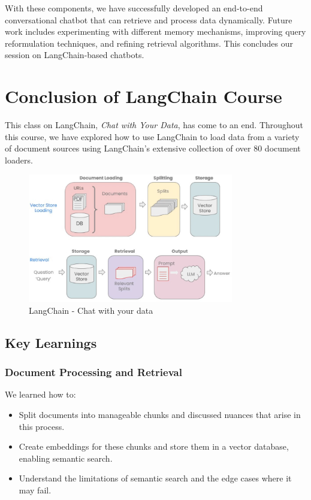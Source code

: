 \documentclass{article}
\begin{document}
With these components, we have successfully developed an end-to-end conversational chatbot that can retrieve and process data dynamically. Future work includes experimenting with different memory mechanisms, improving query reformulation techniques, and refining retrieval algorithms. This concludes our session on LangChain-based chatbots.

\section{Conclusion of LangChain Course}

This class on LangChain, \textit{Chat with Your Data}, has come to an end. Throughout this course, we have explored how to use LangChain to load data from a variety of document sources using LangChain's extensive collection of over 80 document loaders.

\begin{figure}[H]
    \centering
    \includegraphics[width=0.8\textwidth]{images/langchain_chat_with_your_data_022.png}
    \caption{LangChain - Chat with your data}
    \label{fig:langchain_chat_with_your_data}
\end{figure}

\subsection{Key Learnings}

\subsubsection{Document Processing and Retrieval}

We learned how to:

\begin{itemize}
    \item Split documents into manageable chunks and discussed nuances that arise in this process.
    \item Create embeddings for these chunks and store them in a vector database, enabling semantic search.
    \item Understand the limitations of semantic search and the edge cases where it may fail.
\end{itemize}
\end{document}
